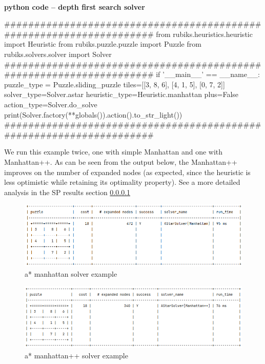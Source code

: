 \afblue
\paragraph{}{\textbf{python code -- depth first search solver}}
\begin{python}
####################################################################
from rubiks.heuristics.heuristic import Heuristic
from rubiks.puzzle.puzzle import Puzzle
from rubiks.solvers.solver import Solver
####################################################################
if '__main__' == __name__:
    puzzle_type = Puzzle.sliding_puzzle
    tiles=[[3, 8, 6], [4, 1, 5], [0, 7, 2]]
    solver_type=Solver.astar
    heuristic_type=Heuristic.manhattan
    plus=False
    action_type=Solver.do_solve
    print(Solver.factory(**globals()).action().to_str_light())
####################################################################
\end{python}
\black
We run this example twice, one with simple Manhattan and one with Manhattan++. As can be seen from the output below, the Manhattan++ improves on the number of expanded nodes (as expected, since the heuristic is less optimistic while retaining its optimality property). See a more detailed analysis in the SP results section \ref{}

\begin{figure}[H]
\centering
\includegraphics[scale=0.5]{./Figures/exampleastarmanhattansolver}
\caption[Examples]{a* manhattan solver example}
\label{fig:exampleastarmanhattansolver}
\end{figure}

\begin{figure}[H]
\centering
\includegraphics[scale=0.5]{./Figures/exampleastarmanhattanplussolver}
\caption[Examples]{a* manhattan++ solver example}
\label{fig:exampleastarmanhattanplussolver}
\end{figure}



